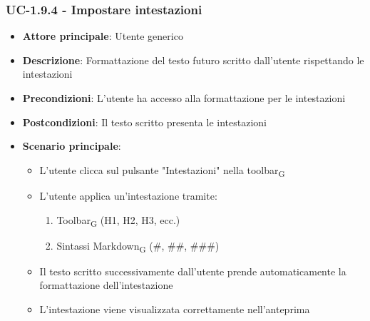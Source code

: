 \documentclass[11pt,a4paper]{article}
\newcommand{\gls}[1]{#1\textsubscript{G}}
\begin{document}
\subsubsection{UC-1.9.4 - Impostare intestazioni}
\begin{itemize}
    \item \textbf{Attore principale}: Utente generico
    \item \textbf{Descrizione}: Formattazione del testo futuro scritto dall’utente rispettando le intestazioni
    \item \textbf{Precondizioni}: L’utente ha accesso alla formattazione per le intestazioni
    \item \textbf{Postcondizioni}: Il testo scritto presenta le intestazioni
    \item \textbf{Scenario principale}:
        \begin{itemize}
            \item L’utente clicca sul pulsante "Intestazioni" nella \gls{toolbar}
            \item L’utente applica un’intestazione tramite:
                \begin{enumerate}
                    \item \gls{Toolbar} (H1, H2, H3, ecc.)
                    \item Sintassi \gls{Markdown} (\#, \#\#, \#\#\#)
                \end{enumerate}
            \item Il testo scritto successivamente dall'utente prende automaticamente la formattazione dell'intestazione
            \item L'intestazione viene visualizzata correttamente nell'anteprima
        \end{itemize}
\end{itemize}
\end{document}
